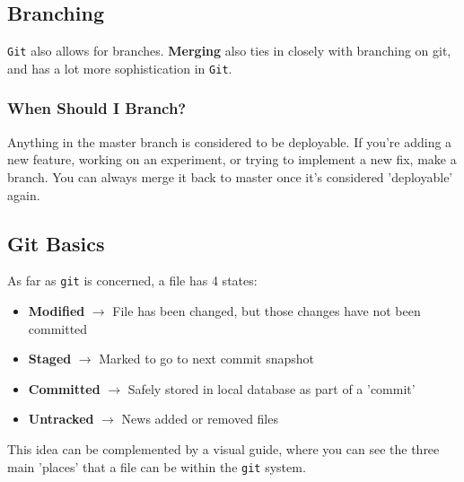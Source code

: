 \documentclass[english, 10pt]{article}
\begin{document}
\subsection{Branching}

\texttt{Git} also allows for branches. \textbf{Merging} also ties in closely with branching on git, and has a lot more sophistication in \texttt{Git}.

\subsubsection{When Should I Branch?}

Anything in the master branch is considered to be deployable. If you're adding a new feature, working on an experiment, or trying to implement a new fix, make a branch. You can always merge it back to master once it's considered 'deployable' again.

\subsection{Git Basics}

As far as \texttt{git} is concerned, a file has 4 states:

\begin{itemize}
	\item \textbf{Modified} $\rightarrow$ File has been changed, but those changes have not been committed
	\item \textbf{Staged} $\rightarrow$ Marked to go to next commit snapshot
	\item \textbf{Committed} $\rightarrow$ Safely stored in local database as part of a 'commit'
	\item \textbf{Untracked} $\rightarrow$ News added or removed files
\end{itemize}

This idea can be complemented by a visual guide, where you can see the three main 'places' that a file can be within the \texttt{git} system.\\
\end{document}

